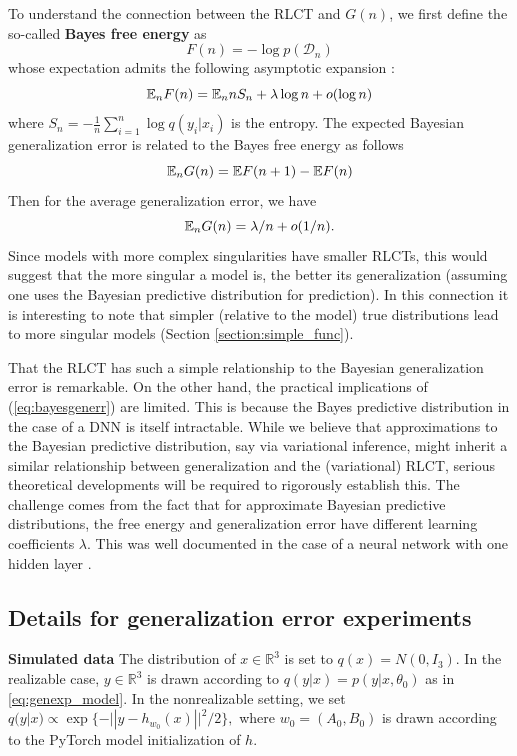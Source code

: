 \documentclass{article} %
\begin{document}
To understand the connection between the RLCT and $G(n)$, we first define the so-called \textbf{Bayes free energy} as 
\[
F(n) = -\log p(\mathcal D_n)
\]
whose expectation admits the following asymptotic expansion \cite{watanabe_algebraic_2009}:
\[
{\mathbb{E}}_n F(n) =  {\mathbb{E}}_n n S_n + \lambda \log n + o(\log n)
\]
where $S_n = -\frac{1}{n} \sum_{i=1}^n \log q(y_i|x_i)$ is the entropy. 
The expected Bayesian generalization error is related to the Bayes free energy as follows
\[
{\mathbb{E}}_n G(n) = \mathbb{E} F(n+1) - \mathbb{E} F(n)
\]
Then for the average generalization error, we have
\begin{equation}
{\mathbb{E}}_n G(n) = \lambda/n + o(1/n).
\label{eq:bayesgenerr}
\end{equation}
Since models with more complex singularities have smaller RLCTs, this would suggest that the more singular a model is, the better its generalization (assuming one uses the Bayesian predictive distribution for prediction). In this connection it is interesting to note that simpler (relative to the model) true distributions lead to more singular models (Section \ref{section:simple_func}).

That the RLCT has such a simple relationship to the Bayesian generalization error is remarkable. On the other hand, the practical implications of (\ref{eq:bayesgenerr}) are limited. This is because the Bayes predictive distribution in the case of a DNN is itself intractable. While we believe that approximations to the Bayesian predictive distribution, say via variational inference, might inherit a similar relationship between generalization and the (variational) RLCT, serious theoretical developments will be required to rigorously establish this. The challenge comes from the fact that for approximate Bayesian predictive distributions, the free energy and generalization error have different learning coefficients $\lambda$. This was well documented in the case of a neural network with one hidden layer \citep{nakajima_variational_2007}. 

\subsection{Details for generalization error experiments}
\label{appendix:generalizaton}

\textbf{Simulated data}
The distribution of $x \in \mathbb R^3$ is set to $q(x)=N(0,I_3)$. 
In the realizable case, $y \in \mathbb R^3$ is drawn according to $q(y|x) = p(y|x,\theta_0)$ as in \eqref{eq:genexp_model}. In the nonrealizable setting, we set $q(y|x) \propto \exp\{-|| y - h_{w_0}(x) ||^2/2\},$ where $w_0 = (A_0,B_0)$ is drawn according to the PyTorch model initialization of $h$.
\end{document}
